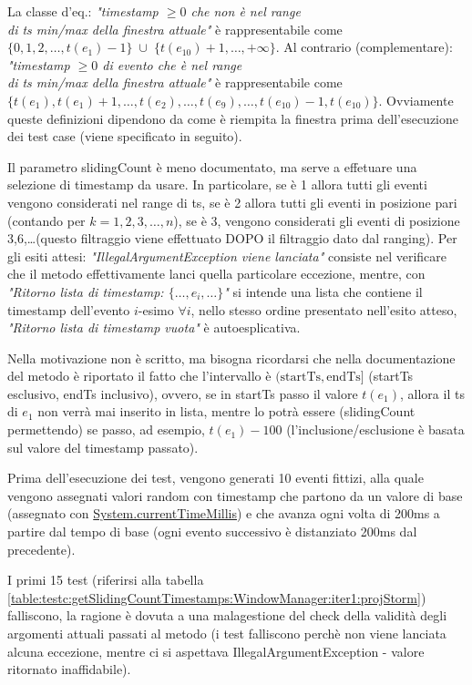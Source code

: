 \documentclass[10pt, a4paper]{article}
\newcommand{\gettablelabel}[5]{table:#1:#2:#3:iter#4:proj#5}
\def\storm{Storm}
\begin{document}
	La classe d'eq.: \textit{"timestamp $\ge 0$ che non è nel range\\ di ts min/max della finestra attuale"}
	è rappresentabile come $\{0,1,2,\dots,t(e_1)-1\}\;\cup\;\{t(e_{10})+1,\dots,+\infty\}$.
	Al contrario (complementare): 
	\textit{"timestamp $\ge 0$ di evento che è nel range\\ di ts min/max della finestra attuale"} è
	rappresentabile come $\{t(e_1),t(e_1)+1,\dots,t(e_2),\dots,t(e_9),\dots,t(e_{10})-1,t(e_{10})\}$. 
	Ovviamente queste definizioni dipendono da come è riempita la finestra prima dell'esecuzione dei test case
	(viene specificato in seguito).
	
	Il parametro slidingCount è meno documentato, ma serve a effetuare una selezione di timestamp da usare.
	In particolare, se è 1 allora tutti gli eventi vengono considerati nel range di ts, se è 2 allora tutti gli
	eventi in posizione pari (contando per $k=1,2,3,\dots,n$), se è 3, vengono considerati gli eventi di posizione
	3,6,\dots (questo filtraggio viene effettuato DOPO il filtraggio dato dal ranging).
	Per gli esiti attesi: \textit{"IllegalArgumentException viene lanciata"} consiste nel verificare che il metodo
	effettivamente lanci quella particolare eccezione, mentre, con 
	\textit{"Ritorno lista di timestamp: $\{\dots,e_i,\dots\}$"} si intende una lista che contiene il timestamp
	dell'evento $i$-esimo $\forall i$, nello stesso ordine presentato nell'esito atteso, 
	\textit{"Ritorno lista di timestamp vuota"} è autoesplicativa.
	
	Nella motivazione non è scritto, ma bisogna ricordarsi che nella documentazione del metodo è riportato il
	fatto che l'intervallo è $(\text{startTs},\text{endTs}]$ 
	(startTs esclusivo, endTs inclusivo), ovvero, se in startTs passo il valore $t(e_1)$, allora
	il ts di $e_1$ non verrà mai inserito in lista, mentre lo potrà essere (slidingCount permettendo)
	se passo, ad esempio, $t(e_1) - 100$ (l'inclusione/esclusione è basata sul valore del timestamp passato).
	
	Prima dell'esecuzione dei test, vengono generati 10 eventi fittizi, alla quale vengono assegnati valori random
	con timestamp che partono da un valore di base (assegnato con 
	\href{https://docs.oracle.com/javase/8/docs/api/java/lang/System.html#currentTimeMillis--}
	{System.currentTimeMillis}) e che avanza ogni volta
	di 200ms a partire dal tempo di base (ogni evento successivo è distanziato 200ms dal precedente).
	
	I primi 15 test (riferirsi alla tabella 
	\ref{\gettablelabel{testc}{getSlidingCountTimestamps}{WindowManager}{1}{\storm}})
	falliscono, la ragione è dovuta a una malagestione del check della validità degli argomenti attuali passati al
	metodo (i test falliscono perchè non viene lanciata alcuna eccezione, mentre ci si aspettava 
	IllegalArgumentException - valore ritornato inaffidabile). 
	
\end{document}
